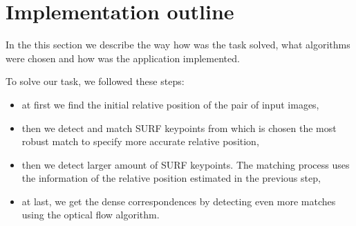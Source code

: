 
\section{Implementation outline}
\label{sec:impl_outline}
In the this section we describe the way how was the task solved, what algorithms were chosen and how was the application implemented.

To solve our task, we followed these steps:
\begin{itemize}
\item at first we find the initial relative position of the pair of input images,
\item then we detect and match SURF keypoints from which is chosen the most robust match to specify more accurate relative position,
\item then we detect larger amount of SURF keypoints. The matching process uses the information of the relative position estimated in the previous step,
\item at last, we get the dense correspondences by detecting even more matches using the optical flow algorithm.
\end{itemize}

